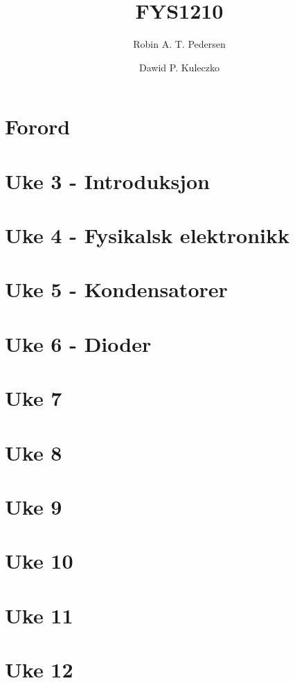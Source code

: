 \documentclass{article}
\begin{document}
  \title{FYS1210}
  \author{Robin A. T. Pedersen \and Dawid P. Kuleczko}
  \maketitle
  \tableofcontents

  \section{Forord}
    

  \section{Uke 3 - Introduksjon}
    

  \section{Uke 4 - Fysikalsk elektronikk}
    

  \section{Uke 5 - Kondensatorer}
    

  \section{Uke 6 - Dioder}
    

  \section{Uke 7}
  \section{Uke 8}
  \section{Uke 9}
  \section{Uke 10}
  \section{Uke 11}
  \section{Uke 12}
\end{document}
